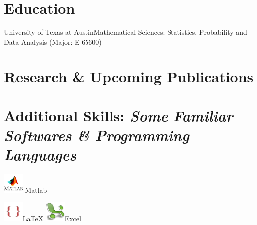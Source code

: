 \documentclass[11pt,a4paper,cambria]{moderncv}
\title{}
\begin{document}
\makecvtitle

\section*{\textbf{Education}}
{University of Texas at Austin}{}{\newline Mathematical Sciences: Statistics, Probability and Data Analysis (Major: E 65600)}{}

\section*{\textbf{Research \& Upcoming Publications}}

\section*{\textbf{Additional Skills: \small\textit{Some Familiar Softwares \& Programming Languages}}}
\renewcommand{\listitemsymbol}{-~}
\setlength{\columnsep}{1pt}
\begin{multicols}{3}
\cvitemwithcomment
{\includegraphics[width=1cm,height=1cm]{Matlab}}{ Matlab}{}
\end{multicols}
\begin{multicols}{3}
\cvitemwithcomment
{\includegraphics[width=1cm,height=1cm]{LatexLogo}}{LaTeX}{}
\cvitemwithcomment
{\includegraphics[width=1cm,height=1cm]{ExcelLogo.png}}{Excel}{}
\end{multicols}
\end{document}
